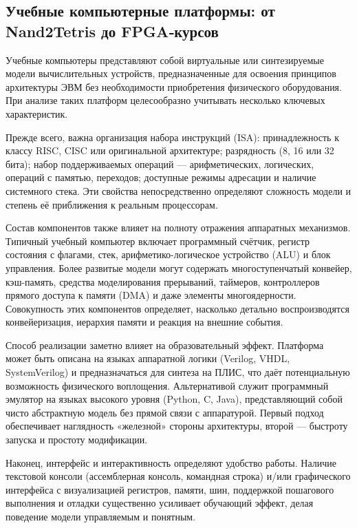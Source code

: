 \subsection{Учебные компьютерные платформы: от Nand2Tetris до FPGA‑курсов}

Учебные компьютеры представляют собой виртуальные или синтезируемые модели вычислительных устройств, предназначенные для освоения принципов архитектуры ЭВМ без необходимости приобретения физического оборудования. При анализе таких платформ целесообразно учитывать несколько ключевых характеристик.

Прежде всего, важна организация набора инструкций (ISA): принадлежность к классу RISC, CISC или оригинальной архитектуре; разрядность (8, 16 или 32 бита); набор поддерживаемых операций — арифметических, логических, операций с памятью, переходов; доступные режимы адресации и наличие системного стека. Эти свойства непосредственно определяют сложность модели и степень её приближения к реальным процессорам.

Состав компонентов также влияет на полноту отражения аппаратных механизмов. Типичный учебный компьютер включает программный счётчик, регистр состояния с флагами, стек, арифметико-логическое устройство (ALU) и блок управления. Более развитые модели могут содержать многоступенчатый конвейер, кэш-память, средства моделирования прерываний, таймеров, контроллеров прямого доступа к памяти (DMA) и даже элементы многоядерности. Совокупность этих компонентов определяет, насколько детально воспроизводятся конвейеризация, иерархия памяти и реакция на внешние события.

Способ реализации заметно влияет на образовательный эффект. Платформа может быть описана на языках аппаратной логики (Verilog, VHDL, SystemVerilog) и предназначаться для синтеза на ПЛИС, что даёт потенциальную возможность физического воплощения. Альтернативой служит программный эмулятор на языках высокого уровня (Python, C, Java), представляющий собой чисто абстрактную модель без прямой связи с аппаратурой. Первый подход обеспечивает наглядность «железной» стороны архитектуры, второй — быстроту запуска и простоту модификации.

Наконец, интерфейс и интерактивность определяют удобство работы. Наличие текстовой консоли (ассемблерная консоль, командная строка) и/или графического интерфейса с визуализацией регистров, памяти, шин, поддержкой пошагового выполнения и отладки существенно усиливает обучающий эффект, делая поведение модели управляемым и понятным.

